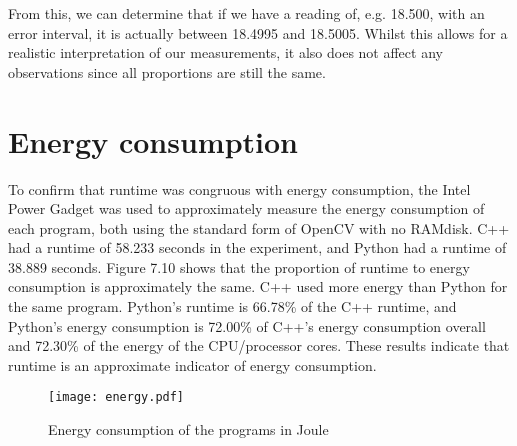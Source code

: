From this, we can determine that if we have a reading of, e.g. 18.500, with an error interval, it is actually between 18.4995 and 18.5005. Whilst this allows for a realistic interpretation of our measurements, it also does not affect any observations since all proportions are still the same.

\section{Energy consumption}
To confirm that runtime was congruous with energy consumption, the Intel Power Gadget was used to approximately measure the energy consumption of each program, both using the standard form of OpenCV with no RAMdisk. C++ had a runtime of 58.233 seconds in the experiment, and Python had a runtime of 38.889 seconds.
Figure 7.10 shows that the proportion of runtime to energy consumption is approximately the same. C++ used more energy than Python for the same program. Python’s runtime is 66.78\% of the C++ runtime, and Python’s energy consumption is 72.00\% of C++’s energy consumption overall and 72.30\% of the energy of the CPU/processor cores. These results indicate that runtime is an approximate indicator of energy consumption.

\begin{figure}[H]
	\centering
	\texttt{[image: energy.pdf]}
	\caption{Energy consumption of the programs in Joule}
	\label{figure:energy-consumption}
\end{figure}
